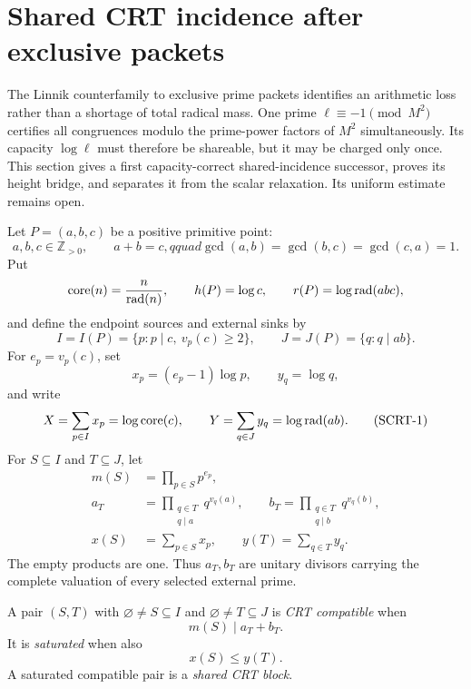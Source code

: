 \section{Shared CRT incidence after exclusive packets}
\label{sec:shared-crt-incidence-successor}

The Linnik counterfamily to exclusive prime packets identifies an arithmetic
loss rather than a shortage of total radical mass.  One prime
$\ell\equiv-1\pmod {M^2}$ certifies all congruences modulo the prime-power
factors of $M^2$ simultaneously.  Its capacity $\log\ell$ must therefore be
shareable, but it may be charged only once.  This section gives a first
capacity-correct shared-incidence successor, proves its height bridge, and
separates it from the scalar relaxation.  Its uniform estimate remains open.

Let $P=(a,b,c)$ be a positive primitive point:
\[
 a,b,c\in\mathbb Z_{>0},\qquad a+b=c,qquad
 \gcd(a,b)=\gcd(b,c)=\gcd(c,a)=1.
\]
Put
\[
 \operatorname{core}(n)=\frac{n}{\operatorname{rad}(n)},\qquad
 h(P)=\log c,\qquad r(P)=\log\operatorname{rad}(abc),
\]
and define the endpoint sources and external sinks by
\[
 I=I(P)=\{p:p\mid c,\ v_p(c)\ge2\},\qquad
 J=J(P)=\{q:q\mid ab\}.
\]
For $e_p=v_p(c)$, set
\[
 x_p=(e_p-1)\log p,\qquad y_q=\log q,
\]
and write
\[
 X=\sum_{p\in I}x_p=\log\operatorname{core}(c),\qquad
 Y=\sum_{q\in J}y_q=\log\operatorname{rad}(ab).
\tag{SCRT-1}
\]
For $S\subseteq I$ and $T\subseteq J$, let
\[
 \begin{split}
 m(S)&=\prod_{p\in S}p^{e_p},\\
 a_T&=\prod_{\substack{q\in T\\q\mid a}}q^{v_q(a)},\qquad
 b_T=\prod_{\substack{q\in T\\q\mid b}}q^{v_q(b)},\\
 x(S)&=\sum_{p\in S}x_p,\qquad y(T)=\sum_{q\in T}y_q.
 \end{split}
\tag{SCRT-2}
\]
The empty products are one.  Thus $a_T,b_T$ are unitary divisors carrying
the complete valuation of every selected external prime.

\begin{definition}
A pair $(S,T)$ with $\varnothing\ne S\subseteq I$ and
$\varnothing\ne T\subseteq J$ is \emph{CRT compatible} when
\[
                         m(S)\mid a_T+b_T.                    \tag{SCRT-3}
\]
It is \emph{saturated} when also
\[
                         x(S)\le y(T).                        \tag{SCRT-4}
\]
A saturated compatible pair is a \emph{shared CRT block}.
\end{definition}

